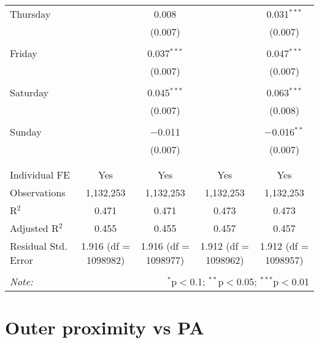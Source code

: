 \documentclass[
]{article}
\begin{document}
\begin{table}[!htbp]
{\begin{tabular}{@{\extracolsep{5pt}}lcccc}
 Thursday &  & 0.008 &  & 0.031$^{***}$ \\ 
  &  & (0.007) &  & (0.007) \\ 
  & & & & \\ 
 Friday &  & 0.037$^{***}$ &  & 0.047$^{***}$ \\ 
  &  & (0.007) &  & (0.007) \\ 
  & & & & \\ 
 Saturday &  & 0.045$^{***}$ &  & 0.063$^{***}$ \\ 
  &  & (0.007) &  & (0.008) \\ 
  & & & & \\ 
 Sunday &  & $-$0.011 &  & $-$0.016$^{**}$ \\ 
  &  & (0.007) &  & (0.007) \\ 
  & & & & \\ 
\hline \\[-1.8ex] 
Individual FE & Yes & Yes & Yes & Yes \\ 
Observations & 1,132,253 & 1,132,253 & 1,132,253 & 1,132,253 \\ 
R$^{2}$ & 0.471 & 0.471 & 0.473 & 0.473 \\ 
Adjusted R$^{2}$ & 0.455 & 0.455 & 0.457 & 0.457 \\ 
Residual Std. Error & 1.916 (df = 1098982) & 1.916 (df = 1098977) & 1.912 (df = 1098962) & 1.912 (df = 1098957) \\ 
\hline 
\hline \\[-1.8ex] 
\textit{Note:}  & \multicolumn{4}{r}{$^{*}$p$<$0.1; $^{**}$p$<$0.05; $^{***}$p$<$0.01} \\ 
\end{tabular}
} 
\end{table} 
\newpage
\section{Outer proximity vs PA}
\end{document}
